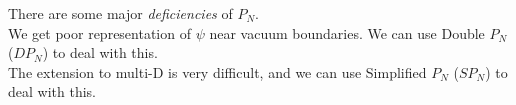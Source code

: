 \documentclass[12pt]{article}
\begin{document}
There are some major \textit{deficiencies} of $P_N$. \\
We get poor representation of $\psi$ near vacuum boundaries. We can use Double $P_N$ ($DP_N$) to deal with this.\\
The extension to multi-D is very difficult, and we can use Simplified $P_N$ ($SP_N$) to deal with this.






 
\end{document}
